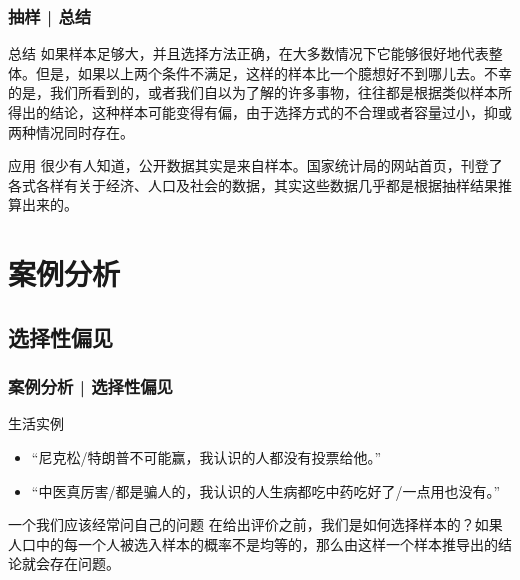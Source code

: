 \begin{frame}
  \frametitle{抽样 | 总结}
  \begin{block}{总结}
如果样本足够大，并且选择方法正确，在大多数情况下它能够很好地代表整体。但是，如果以上两个条件不满足，这样的样本比一个臆想好不到哪儿去。不幸的是，我们所看到的，或者我们自以为了解的许多事物，往往都是根据类似样本所得出的结论，这种样本可能变得有偏，由于选择方式的不合理或者容量过小，抑或两种情况同时存在。
  \end{block}
  \pause
  \begin{block}{应用}
很少有人知道，公开数据其实是来自样本。国家统计局的网站首页，刊登了各式各样有关于经济、人口及社会的数据，其实这些数据几乎都是根据抽样结果推算出来的。
  \end{block}
\end{frame}

\section{案例分析}
\subsection{选择性偏见}
\begin{frame}
  \frametitle{案例分析 | 选择性偏见}
  \begin{block}{生活实例}
    \begin{itemize}
      \item “尼克松/特朗普不可能赢，我认识的人都没有投票给他。”
      \item “中医真厉害/都是骗人的，我认识的人生病都吃中药吃好了/一点用也没有。”
    \end{itemize}
  \end{block}
  \pause
  \begin{block}{一个我们应该经常问自己的问题}
    在给出评价之前，我们是如何选择样本的？如果人口中的每一个人被选入样本的概率不是均等的，那么由这样一个样本推导出的结论就会存在问题。
  \end{block}
\end{frame}

